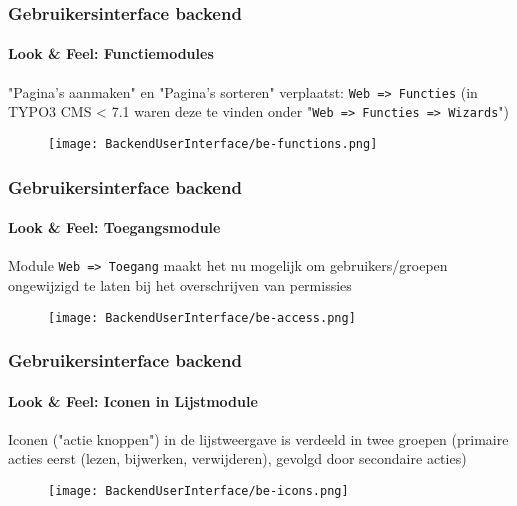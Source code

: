 \begin{frame}[fragile]
	\frametitle{Gebruikersinterface backend}
	\framesubtitle{Look \& Feel: Functiemodules}

	"Pagina's aanmaken" en "Pagina's sorteren" verplaatst: \texttt{Web => Functies}\newline
	\smaller (in TYPO3 CMS < 7.1 waren deze te vinden onder "\texttt{Web => Functies => Wizards}")

	\begin{figure}
		\texttt{[image: BackendUserInterface/be-functions.png]}
	\end{figure}


\end{frame}


\begin{frame}[fragile]
	\frametitle{Gebruikersinterface backend}
	\framesubtitle{Look \& Feel: Toegangsmodule}

	Module \texttt{Web => Toegang} maakt het nu mogelijk om gebruikers/groepen ongewijzigd
	te laten bij het overschrijven van permissies

	\begin{figure}
		\texttt{[image: BackendUserInterface/be-access.png]}
	\end{figure}

\end{frame}


\begin{frame}[fragile]
	\frametitle{Gebruikersinterface backend}
	\framesubtitle{Look \& Feel: Iconen in Lijstmodule}

	Iconen ("actie knoppen") in de lijstweergave is verdeeld in twee groepen\newline
	\smaller (primaire acties eerst (lezen, bijwerken, verwijderen), gevolgd door secondaire acties)

	\begin{figure}
		\texttt{[image: BackendUserInterface/be-icons.png]}
	\end{figure}

\end{frame}

